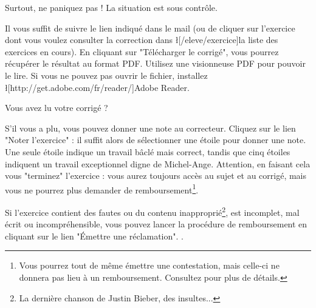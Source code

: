 ﻿Surtout, ne paniquez pas ! La situation est sous contrôle.

Il vous suffit de suivre le lien indiqué dans le mail (ou de cliquer sur l'exercice dont vous voulez consulter la correction dans  \l[/eleve/exercice]{la liste des exercices en cours}).
En cliquant sur "Télécharger le corrigé", vous pourrez récupérer le résultat au format PDF. Utilisez une visionneuse PDF pour pouvoir le lire. Si vous ne pouvez pas ouvrir le fichier, installez \l[http://get.adobe.com/fr/reader/]{Adobe Reader}.

Vous avez lu votre corrigé ?
\item S'il vous a plu, vous pouvez donner une note au correcteur. Cliquez sur le lien "Noter l'exercice" : il suffit alors de sélectionner une étoile pour donner une note. Une seule étoile indique un travail bâclé mais correct, tandis que cinq étoiles indiquent un travail exceptionnel digne de Michel-Ange. Attention, en faisant cela vous "terminez" l'exercice : vous aurez toujours accès au sujet et au corrigé, mais vous ne pourrez plus demander de remboursement\footnote{Vous pourrez tout de même émettre une contestation, mais celle-ci ne donnera pas lieu à un remboursement. Consultez  pour plus de détails.}.
\item Si l'exercice contient des fautes ou du contenu inapproprié\footnote{La dernière chanson de Justin Bieber, des insultes...}, est incomplet, mal écrit ou incompréhensible, vous pouvez lancer la procédure de remboursement en cliquant sur le lien "Émettre une réclamation". .
